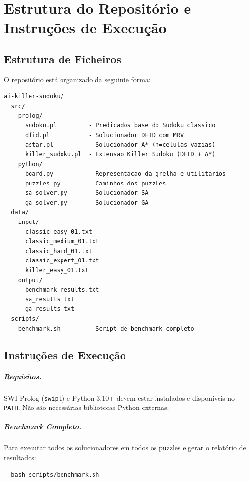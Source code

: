 \chapter{Estrutura do Repositório e Instruções de Execução}
\label{anexo1}

\section{Estrutura de Ficheiros}
\label{sec:estrutura_ficheiros}

O repositório está organizado da seguinte forma:

\begin{verbatim}
ai-killer-sudoku/
  src/
    prolog/
      sudoku.pl         - Predicados base do Sudoku classico
      dfid.pl           - Solucionador DFID com MRV
      astar.pl          - Solucionador A* (h=celulas vazias)
      killer_sudoku.pl  - Extensao Killer Sudoku (DFID + A*)
    python/
      board.py          - Representacao da grelha e utilitarios
      puzzles.py        - Caminhos dos puzzles
      sa_solver.py      - Solucionador SA
      ga_solver.py      - Solucionador GA
  data/
    input/
      classic_easy_01.txt
      classic_medium_01.txt
      classic_hard_01.txt
      classic_expert_01.txt
      killer_easy_01.txt
    output/
      benchmark_results.txt
      sa_results.txt
      ga_results.txt
  scripts/
    benchmark.sh        - Script de benchmark completo
\end{verbatim}

\section{Instruções de Execução}
\label{sec:instrucoes}

\paragraph{Requisitos.}
SWI-Prolog (\texttt{swipl}) e Python 3.10+ devem estar instalados e disponíveis no \texttt{PATH}. Não são necessárias bibliotecas Python externas.

\paragraph{Benchmark Completo.}
Para executar todos os solucionadores em todos os puzzles e gerar o relatório de resultados:
\begin{verbatim}
  bash scripts/benchmark.sh
\end{verbatim}

